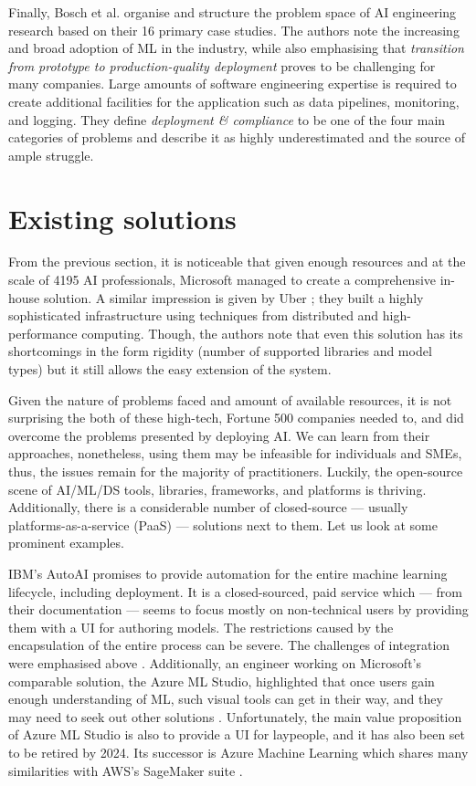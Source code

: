 Finally, Bosch et al. \cite{bosch2021engineering} organise and structure the problem space of AI engineering research based on their 16 primary case studies. The authors note the increasing and broad adoption of ML in the industry, while also emphasising that \textit{transition from prototype to production-quality deployment} proves to be challenging for many companies. Large amounts of software engineering expertise is required to create additional facilities for the application such as data pipelines, monitoring, and logging. They define \textit{deployment \& compliance} to be one of the four main categories of problems and describe it as highly underestimated and the source of ample struggle.

\section{Existing solutions} \label{section:existing}

From the previous section, it is noticeable that given enough resources and at the scale of 4195 AI professionals, Microsoft managed to create a comprehensive in-house solution. A similar impression is given by Uber \cite{li2017scaling}; they built a highly sophisticated infrastructure using techniques from distributed and high-performance computing. Though, the authors note that even this solution has its shortcomings in the form rigidity (number of supported libraries and model types) but it still allows the easy extension of the system.

Given the nature of problems faced and amount of available resources, it is not surprising the both of these high-tech, Fortune 500 companies needed to, and did overcome the problems presented by deploying AI. We can learn from their approaches, nonetheless, using them may be infeasible for individuals and SMEs, thus, the issues remain for the majority of practitioners. Luckily, the open-source scene of AI/ML/DS tools, libraries, frameworks, and platforms is thriving. Additionally, there is a considerable number of closed-source --- usually platforms-as-a-service (PaaS) --- solutions next to them. Let us look at some prominent examples.

IBM's AutoAI \cite{wang2020autoai} promises to provide automation for the entire machine learning lifecycle, including deployment. It is a closed-sourced, paid service which --- from their documentation --- seems to focus mostly on non-technical users by providing them with a UI for authoring models. The restrictions caused by the encapsulation of the entire process can be severe. The challenges of integration were emphasised above \cite{sculley2015hidden}. Additionally, an engineer working on Microsoft's comparable solution, the Azure ML Studio, highlighted that once users gain enough understanding of ML, such visual tools can get in their way, and they may need to seek out other solutions \cite{amershi2019software}. Unfortunately, the main value proposition of Azure ML Studio is also to provide a UI for laypeople, and it has also been set to be retired by 2024. Its successor is Azure Machine Learning which shares many similarities with AWS's SageMaker suite \cite{joshi2020amazon}.


